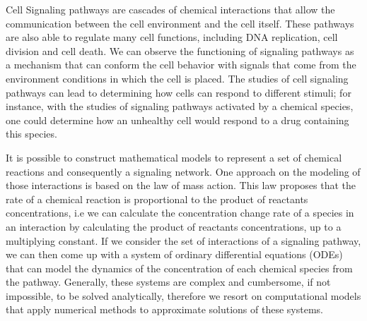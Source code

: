 




Cell Signaling pathways are cascades of chemical interactions that 
allow the communication between the cell environment and the 
cell itself. These pathways are also able to regulate many cell 
functions, including DNA replication, cell division and cell death. We
can observe the functioning of signaling pathways as a mechanism that 
can conform the cell behavior with signals that come from the 
environment conditions in which the cell is placed. The studies of cell 
signaling pathways can lead to determining how cells can respond to 
different stimuli; for instance, with the studies of signaling pathways
activated by a chemical species, one could determine how an unhealthy 
cell would respond to a drug containing this species.

It is possible to construct mathematical models to represent a set of
chemical reactions and consequently a signaling network. One approach on 
the modeling of those interactions is based on the law of mass action. 
This law proposes that the rate of a chemical reaction is proportional 
to the product of reactants concentrations, i.e we can calculate the 
concentration change rate of a species in an interaction by calculating 
the product of reactants concentrations, up to a multiplying constant. 
If we consider the set of interactions of a signaling pathway, we can
then come up with a system of ordinary differential equations (ODEs) 
that can model the dynamics of the concentration of each chemical 
species from the pathway. Generally, these systems are complex and 
cumbersome, if not impossible, to be solved analytically, therefore we 
resort on computational models that apply numerical methods to 
approximate solutions of these systems.

